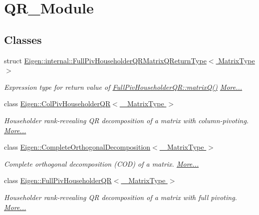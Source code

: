 \hypertarget{group___q_r___module}{}\section{Q\+R\+\_\+\+Module}
\label{group___q_r___module}
\subsection*{Classes}
\begin{DoxyCompactItemize}
\item 
struct \hyperlink{group___q_r___module_struct_eigen_1_1internal_1_1_full_piv_householder_q_r_matrix_q_return_type}{Eigen\+::internal\+::\+Full\+Piv\+Householder\+Q\+R\+Matrix\+Q\+Return\+Type$<$ Matrix\+Type $>$}
\begin{DoxyCompactList}\small\item\em Expression type for return value of \hyperlink{group___q_r___module_ad26dd2d3c002939771d2375e4e051c28}{Full\+Piv\+Householder\+Q\+R\+::matrix\+Q()}  \hyperlink{group___q_r___module_struct_eigen_1_1internal_1_1_full_piv_householder_q_r_matrix_q_return_type}{More...}\end{DoxyCompactList}\item 
class \hyperlink{group___q_r___module_class_eigen_1_1_col_piv_householder_q_r}{Eigen\+::\+Col\+Piv\+Householder\+Q\+R$<$ \+\_\+\+Matrix\+Type $>$}
\begin{DoxyCompactList}\small\item\em Householder rank-\/revealing QR decomposition of a matrix with column-\/pivoting.  \hyperlink{group___q_r___module_class_eigen_1_1_col_piv_householder_q_r}{More...}\end{DoxyCompactList}\item 
class \hyperlink{group___q_r___module_class_eigen_1_1_complete_orthogonal_decomposition}{Eigen\+::\+Complete\+Orthogonal\+Decomposition$<$ \+\_\+\+Matrix\+Type $>$}
\begin{DoxyCompactList}\small\item\em Complete orthogonal decomposition (C\+OD) of a matrix.  \hyperlink{group___q_r___module_class_eigen_1_1_complete_orthogonal_decomposition}{More...}\end{DoxyCompactList}\item 
class \hyperlink{group___q_r___module_class_eigen_1_1_full_piv_householder_q_r}{Eigen\+::\+Full\+Piv\+Householder\+Q\+R$<$ \+\_\+\+Matrix\+Type $>$}
\begin{DoxyCompactList}\small\item\em Householder rank-\/revealing QR decomposition of a matrix with full pivoting.  \hyperlink{group___q_r___module_class_eigen_1_1_full_piv_householder_q_r}{More...}\end{DoxyCompactList}\item 

\end{DoxyCompactItemize}
